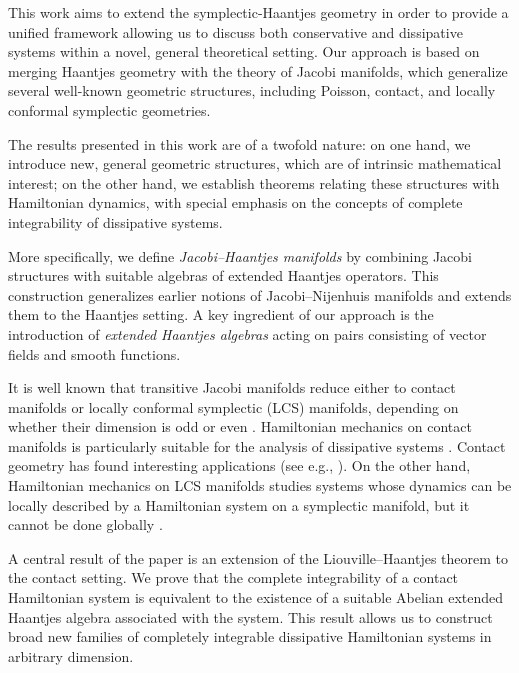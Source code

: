 \documentclass[10pt]{amsart}
\numberwithin{equation}{section}
\theoremstyle{definition}
\begin{document}
This work aims to extend the symplectic-Haantjes geometry in order to provide a unified framework allowing us to discuss both conservative and dissipative systems within a novel, general theoretical setting. Our approach is based on merging Haantjes geometry with the theory of Jacobi manifolds, which generalize several well-known geometric structures, including Poisson, contact, and locally conformal symplectic geometries.
\vspace{2mm}

The results presented in this work are of a twofold nature: on one hand, we introduce new, general geometric structures, which are of intrinsic mathematical interest; on the other hand, we establish theorems relating these structures with Hamiltonian dynamics, with special emphasis on the concepts of complete integrability of dissipative systems.
\vspace{2mm}

More specifically, we define \textit{Jacobi--Haantjes manifolds} by combining Jacobi structures with suitable algebras of extended Haantjes operators. This construction generalizes earlier notions of Jacobi–Nijenhuis manifolds \cite{MMPCRAS1999,PNJGP2003} and extends them to the Haantjes setting. A key ingredient of our approach is the introduction of \textit{extended Haantjes algebras} acting on pairs consisting of vector fields and smooth functions.
\vspace{2mm}

It is well known that transitive Jacobi manifolds reduce either to contact manifolds or locally conformal symplectic (LCS) manifolds, depending on whether their dimension is odd or even \cite{Marle1991}. Hamiltonian mechanics on contact manifolds is particularly suitable for the analysis of dissipative systems \cite{BCTAOP2017,dLS2017}. Contact geometry has found interesting applications (see e.g., \cite{CN1996FP,R2008AOP,G2008,AS}). On the other hand, Hamiltonian mechanics on LCS manifolds studies systems whose dynamics can be locally described by a Hamiltonian system on a symplectic manifold, but it cannot be done globally \cite{esen2021hamilton}.
\vspace{2mm}

A central result of the paper is an extension of the Liouville–Haantjes theorem to the contact setting. We prove that the complete integrability of a contact Hamiltonian system is equivalent to the existence of a suitable Abelian extended Haantjes algebra associated with the system. This result allows us to construct broad new families of completely integrable dissipative Hamiltonian systems in arbitrary dimension.
\vspace{2mm}
\end{document}
